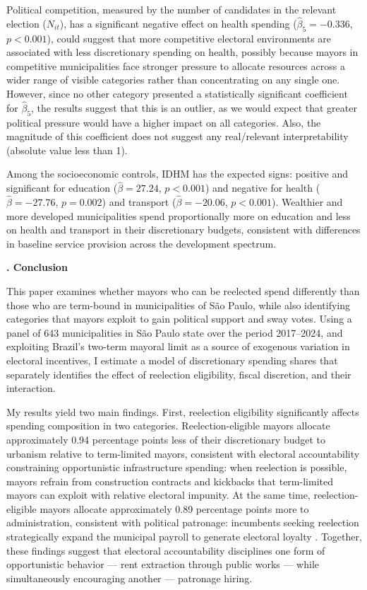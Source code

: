 \documentclass[12pt, a4paper]{article}
\newcounter{headercounter}
\newcommand{\header}[1]{\begin{center}{\large \textbf{\Roman{headercounter}. #1}} \end{center} \stepcounter{headercounter}}
\begin{document}
Political competition, measured by the number of candidates in the relevant election ($N_{it}$), has a significant negative effect on health spending ($\hat{\beta}_5 = -0.336$, $p < 0.001$), could suggest that more competitive electoral environments are associated with less discretionary spending on health, possibly because mayors in competitive municipalities face stronger pressure to allocate resources across a wider range of visible categories rather than concentrating on any single one. However, since no other category presented a statistically significant coefficient for $\hat{\beta}_5$, the results suggest that this is an outlier, as we would expect that greater political pressure would have a higher impact on all categories. Also, the magnitude of this coefficient does not suggest any real/relevant interpretability (absolute value less than 1).

Among the socioeconomic controls, IDHM has the expected signs: positive and significant for education ($\hat{\beta} = 27.24$, $p < 0.001$) and negative for health ($\hat{\beta} = -27.76$, $p = 0.002$) and transport ($\hat{\beta} = -20.06$, $p < 0.001$). Wealthier and more developed municipalities spend proportionally more on education and less on health and transport in their discretionary budgets, consistent with differences in baseline service provision across the development spectrum.

\header{Conclusion}

This paper examines whether mayors who can be reelected spend differently than those who are term-bound in municipalities of São Paulo, while also identifying categories that mayors exploit to gain political support and sway votes. Using a panel of 643 municipalities in São Paulo state over the period 2017--2024, and exploiting Brazil's two-term mayoral limit as a source of exogenous variation in electoral incentives, I estimate a model of discretionary spending shares that separately identifies the effect of reelection eligibility, fiscal discretion, and their interaction.

My results yield two main findings. First, reelection eligibility significantly affects spending composition in two categories. Reelection-eligible mayors allocate approximately 0.94 percentage points less of their discretionary budget to urbanism relative to term-limited mayors, consistent with electoral accountability constraining opportunistic infrastructure spending: when reelection is possible, mayors refrain from construction contracts and kickbacks that term-limited mayors can exploit with relative electoral impunity. At the same time, reelection-eligible mayors allocate approximately 0.89 percentage points more to administration, consistent with political patronage: incumbents seeking reelection strategically expand the municipal payroll to generate electoral loyalty \cite{colonnelli:2020}. Together, these findings suggest that electoral accountability disciplines one form of opportunistic behavior --- rent extraction through public works --- while simultaneously encouraging another --- patronage hiring.
\end{document}
